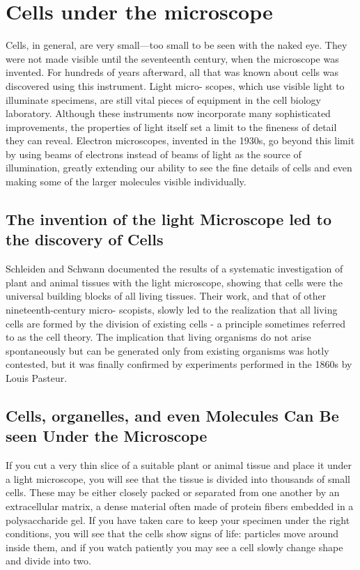 \section{Cells under the microscope}

Cells, in general, are very small—too small to be seen with the naked
eye. They were not made visible until the seventeenth century, when the
microscope was invented. For hundreds of years afterward, all that was
known about cells was discovered using this instrument. Light micro-
scopes, which use visible light to illuminate specimens, are still vital
pieces of equipment in the cell biology laboratory.
Although these instruments now incorporate many sophisticated
improvements, the properties of light itself set a limit to the fineness of
detail they can reveal. Electron microscopes, invented in the 1930s, go
beyond this limit by using beams of electrons instead of beams of light
as the source of illumination, greatly extending our ability to see the fine
details of cells and even making some of the larger molecules visible
individually.

\subsection{The invention of the light Microscope led to the discovery of Cells}

Schleiden and Schwann documented the results
of a systematic investigation of plant and animal tissues with the light
microscope, showing that cells were the universal building blocks of all
living tissues. Their work, and that of other nineteenth-century micro-
scopists, slowly led to the realization that all living cells are formed by
the division of existing cells - a principle sometimes referred to as the
cell theory. The implication that living organisms do not arise
spontaneously but can be generated only from existing organisms was
hotly contested, but it was finally confirmed by experiments performed in
the 1860s by Louis Pasteur.

\subsection{Cells, organelles, and even Molecules Can Be seen Under the Microscope}

If you cut a very thin slice of a suitable plant or animal tissue and place
it under a light microscope, you will see that the tissue is divided into
thousands of small cells. These may be either closely packed or separated
from one another by an extracellular matrix, a dense material often made
of protein fibers embedded in a polysaccharide gel.
If you have taken care
to keep your specimen under the right conditions, you will see that the
cells show signs of life: particles move around inside them, and if you
watch patiently you may see a cell slowly change shape and divide into
two.

